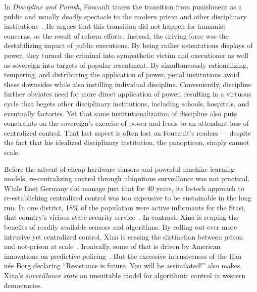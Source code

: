 In \emph{Discipline and Punish}, Foucault traces the transition from punishment
as a public and usually deadly spectacle to the modern prison and other
disciplinary institutions~\cite{Foucault1979}. He argues that this transition
did not happen for humanist concerns, as the result of reform efforts. Instead,
the driving force was the destabilizing impact of public executions. By being
rather ostentatious displays of power, they turned the criminal into sympathetic
victim and executioner as well as sovereign into targets of popular resentment.
By simultaneously rationalizing, tempering, and distributing the application of
power, penal institutions avoid these downsides while also instilling individual
discipline. Conveniently, discipline further obviates need for more direct
application of power, resulting in a virtuous cycle that begets other
disciplinary institutions, including schools, hospitals, and eventually
factories. Yet that same institutionalization of discipline also puts
constraints on the sovereign's exercise of power and leads to an attendant loss
of centralized control. That last aspect is often lost on Foucault's readers ---
despite the fact that his idealized disciplinary institution, the panopticon,
simply cannot scale.

Before the advent of cheap hardware sensors and powerful machine learning
models, re-centralizing control through ubiquitous surveillance was not
practical. While East Germany did manage just that for 40 years, its lo-tech
approach to re-establishing centralized control was too expensive to be
sustainable in the long run. In one district, 18\% of the population were active
informants for the Stasi, that country's vicious state security
service~\cite{Kellerhoff2022}. In contrast, Xina is reaping the benefits of
readily available sensors and algorithms. By rolling out ever more intrusive yet
centralized control, Xina is erasing the distinction between prison and
not-prison at scale~\cite{Grauer2021,MozurXiaoea2022,SmithIV2016}. Ironically,
some of that is driven by American innovations on predictive
policing~\cite{PerryMcInnisea2013,SmithIV2016,Sprick2019}. But the excessive
intrusiveness of the Han n\'ee Borg declaring ``Resistance is future. You will
be assimilated!'' also makes Xina's \emph{surveillance state} an unsuitable
model for algorithmic control in western democracies.

